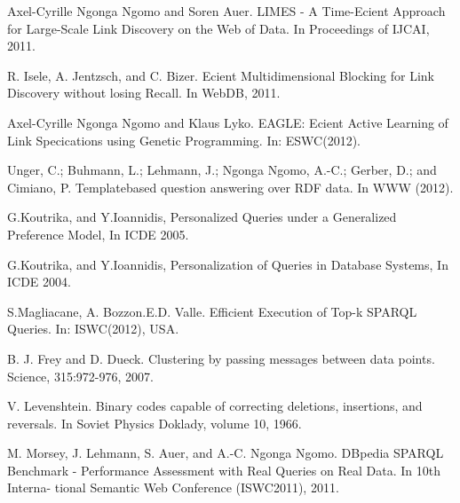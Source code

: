 \documentclass{sig-alternate}  %
\begin{document}
\begin{thebibliography}{10}
Axel-Cyrille Ngonga Ngomo and Soren Auer. LIMES -
A Time-Ecient Approach for Large-Scale Link Discovery on the Web of
Data. In Proceedings of IJCAI, 2011.

 R. Isele, A. Jentzsch, and C. Bizer. Ecient Multidimensional
Blocking for Link Discovery without losing Recall. In WebDB, 2011.

Axel-Cyrille Ngonga Ngomo and Klaus Lyko. EAGLE:
Ecient Active Learning of Link Specications using Genetic Programming.
In: ESWC(2012).

Unger, C.; Buhmann, L.; Lehmann, J.; Ngonga Ngomo,
A.-C.; Gerber, D.; and Cimiano, P. Templatebased question answering
over RDF data. In WWW (2012).

G.Koutrika, and Y.Ioannidis, Personalized Queries
under a Generalized Preference Model, In ICDE 2005.

G.Koutrika, and Y.Ioannidis, Personalization of Queries
in Database Systems, In ICDE 2004.

S.Magliacane, A. Bozzon.E.D. Valle. Efficient Execution
of Top-k SPARQL Queries. In: ISWC(2012), USA. 

B. J. Frey and D. Dueck. Clustering by passing messages
between data points. Science, 315:972-976, 2007.

 V. Levenshtein. Binary codes capable of correcting
deletions, insertions, and reversals. In Soviet Physics Doklady, volume
10, 1966.

M. Morsey, J. Lehmann, S. Auer, and A.-C. {Ngonga Ngomo}.
DBpedia SPARQL Benchmark - Performance Assessment with Real Queries
on Real Data. In 10th Interna- tional Semantic Web Conference (ISWC2011),
2011.
\end{thebibliography}
\end{document}
